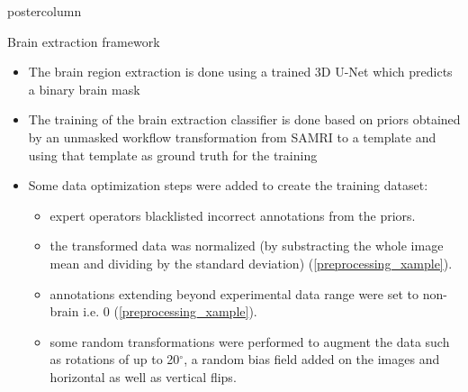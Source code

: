 \begin{frame}
\begin{columns}
\begin{column}{.42\textwidth}
\begin{beamercolorbox}[center]{postercolumn}
\begin{minipage}{.98\textwidth}
{%
                            \begin{myblock}{Brain extraction framework}
                                \begin{itemize}
                                    \item The brain region extraction is done using a trained 3D U-Net \cite{ronneberger_u-net:_2015} which predicts a binary brain mask
                                    \item The training of the brain extraction classifier is done based on priors obtained by an unmasked workflow transformation from \textcolor{lg}{SAMRI} \cite{irsabi} to a template and using that template as ground truth for the training
                                    \item Some data optimization steps were added to create the training dataset:
                                    \begin{itemize}
                                        \item expert operators blacklisted incorrect annotations from the priors.
                                        \item the transformed data was normalized (by substracting the whole image mean and dividing by the standard deviation) (\cref{preprocessing_xample}).
                                        \item annotations extending beyond experimental data range were set to non-brain i.e. 0 (\cref{preprocessing_xample}).
                                        \item some random transformations were performed to augment the data such as rotations of up to 20$^{\circ}$, a random bias field added on the images and horizontal as well as vertical flips.

                                    \end{itemize}
                                \end{itemize}

                                \vspace{1em}


\end{myblock}}
\end{minipage}
\end{beamercolorbox}
\end{column}
\end{columns}
\end{frame}
